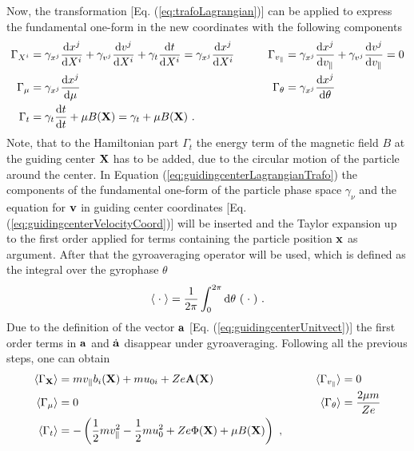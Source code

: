 Now, the transformation [Eq. (\ref{eq:trafoLagrangian})] can be applied to express the fundamental one-form in the new coordinates with the following components
\begin{gather}
    \begin{aligned}
        \Gamma_{X^i} &= \gamma_{x^j} \frac{\mathrm{d}x^j}{\mathrm{d}X^i} + \gamma_{v^j} \frac{\mathrm{d}v^j}{\mathrm{d}X^i} + \gamma_{t} \frac{\mathrm{d}t}{\mathrm{d}X^i} = \gamma_{x^j} \frac{\mathrm{d}x^j}{\mathrm{d}X^i} &\qquad \Gamma_{v_\parallel} &= \gamma_{x^j} \frac{\mathrm{d}x^j}{\mathrm{d}v_\parallel} + \gamma_{v^j} \frac{\mathrm{d}v^j}{\mathrm{d}v_\parallel} = 0 \\
        \Gamma_{\mu} &= \gamma_{x^j} \frac{\mathrm{d}x^j}{\mathrm{d}\mu}                                                                                                                                                      &\qquad \Gamma_{\theta}      &= \gamma_{x^j} \frac{\mathrm{d}x^j}{\mathrm{d}\theta}\\
        \Gamma_{t}   &= \gamma_{t} \frac{\mathrm{d}t}{\mathrm{d}t} + \mu B(\boldsymbol{\mathbf{X}}) = \gamma_t + \mu B(\boldsymbol{\mathbf{X}}) ~. & & \\
    \end{aligned}
    \label{eq:guidingcenterLagrangianTrafo}
\end{gather}
Note, that to the Hamiltonian part $\Gamma_t$ the energy term of the magnetic field $B$ at the guiding center $\boldsymbol{\mathbf{X}}$ has to be added, due to the circular motion of the particle around the center.
\newpage
In Equation (\ref{eq:guidingcenterLagrangianTrafo}) the components of the fundamental one-form of the particle phase space $\gamma_\nu$ and the equation for $\boldsymbol{\mathbf{v}}$ in guiding center coordinates [Eq. (\ref{eq:guidingcenterVelocityCoord})] will be inserted and the Taylor expansion up to the first order applied for terms containing the particle position $\boldsymbol{\mathbf{x}}$ as argument. After that the gyroaveraging operator will be used, which is defined as the integral over the gyrophase $\theta$
\begin{gather}
    \langle \;\cdot\; \rangle = \frac{1}{2\pi} \int_{0}^{2\pi} \mathrm{d}\theta ~ (\;\cdot\;)~.
    \label{eq:gyroaveraging}
\end{gather}
Due to the definition of the vector $\boldsymbol{\mathbf{a}}$ [Eq. (\ref{eq:guidingcenterUnitvect})] the first order terms in $\boldsymbol{\mathbf{a}}$ and $\dot{\boldsymbol{\mathbf{a}}}$ disappear under gyroaveraging. Following all the previous steps, one can obtain
\begin{gather}
    \begin{aligned}
        \langle \Gamma_{\boldsymbol{\mathbf{X}}} \rangle &= m v_\parallel b_i(\boldsymbol{\mathbf{X}}) + mu_{0i} + Ze\boldsymbol{\mathbf{A}}(\boldsymbol{\mathbf{X}}) &\qquad \langle \Gamma_{v_\parallel} \rangle &= 0 \\
        \langle \Gamma_{\mu} \rangle &= 0                                           &\qquad \langle \Gamma_{\theta}      \rangle &= \frac{2\mu m}{Ze}\\
        \langle \Gamma_{t}   \rangle &= - \left(\frac{1}{2}mv_\parallel^2 - \frac{1}{2}mu_0^2 + Ze\Phi(\boldsymbol{\mathbf{X}}) + \mu B(\boldsymbol{\mathbf{X}}) \right) ~, & & \\
    \end{aligned}
    \label{eq:guidingcenterLagrangianTrafoAverage}
\end{gather}
